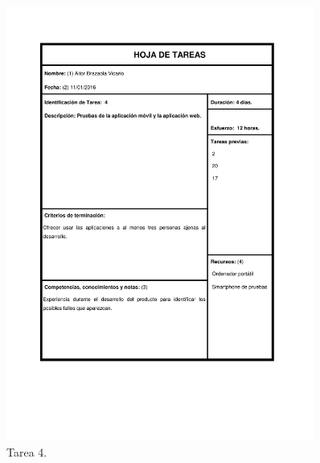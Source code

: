 \documentclass{DeustoFDP}
\begin{document}
\begin{figure}[H]
    \centering
    \includegraphics[width=0.9\textwidth]{fig/Tareas/4}
    \caption{Tarea 4.}
    \label{fig:t4}
\end{figure}

\printliography[heading=intoc]

\appendix

\backmatter
\end{document}
